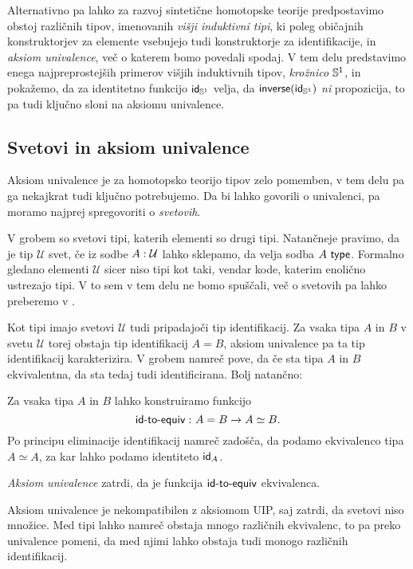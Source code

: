 Alternativno pa lahko za razvoj sintetične homotopske teorije predpostavimo obstoj različnih tipov, imenovanih \emph{višji induktivni tipi}, ki poleg običajnih konstruktorjev za elemente vsebujejo tudi konstruktorje za identifikacije, in \emph{aksiom univalence}, več o katerem bomo povedali spodaj. V tem delu predstavimo enega najpreprostejših primerov višjih induktivnih tipov, \emph{krožnico} \(\mathbb{S}^{1}\), in pokažemo, da za identitetno funkcijo \(\textnormal{\textsf{id}}_{\mathbb{S}^{1}}\) velja, da \(\textnormal{\textsf{inverse}}(\textnormal{\textsf{id}}_{\mathbb{S}^{1}})\) \emph{ni} propozicija, to pa tudi ključno sloni na aksiomu univalence.

\subsection{Svetovi in aksiom univalence}

Aksiom univalence je za homotopsko teorijo tipov zelo pomemben, v tem delu pa ga nekajkrat tudi ključno potrebujemo. Da bi lahko govorili o univalenci, pa moramo najprej spregovoriti o \emph{svetovih}.

V grobem so svetovi tipi, katerih elementi so drugi tipi. Natančneje pravimo, da je tip \(\mathcal{U}\) svet, če iz sodbe \(A : \mathcal{U}\) lahko sklepamo, da velja sodba \(A\ \textnormal{\textsf{type}}\). Formalno gledano elementi \(\mathcal{U}\) sicer niso tipi kot taki, vendar kode, katerim enolično ustrezajo tipi. V to sem v tem delu ne bomo spuščali, več o svetovih pa lahko preberemo v \cite[Poglavje I.6]{rijke2022introduction}.

Kot tipi imajo svetovi \(\mathcal{U}\) tudi pripadajoči tip identifikacij. Za vsaka tipa \(A\) in \(B\) v svetu \(\mathcal{U}\) torej obstaja tip identifikacij \(A = B\), aksiom univalence pa ta tip identifikacij karakterizira. V grobem namreč pove, da če sta tipa \(A\) in \(B\) ekvivalentna, da sta tedaj tudi identificirana. Bolj natančno:

\begin{definicija}
  Za vsaka tipa \(A\) in \(B\) lahko konstruiramo funkcijo
  \[\textnormal{\textsf{id-to-equiv}} \,\colon A = B \to A \simeq B.\]
  Po principu eliminacije identifikacij namreč zadošča, da podamo ekvivalenco tipa \(A \simeq A\), za kar lahko podamo identiteto \(\textnormal{\textsf{id}}_{A}\).

  \emph{Aksiom univalence} zatrdi, da je funkcija \(\textnormal{\textsf{id-to-equiv}}\) ekvivalenca.
\end{definicija}

Aksiom univalence je nekompatibilen z aksiomom UIP, saj zatrdi, da svetovi niso množice. Med tipi lahko namreč obstaja mnogo različnih ekvivalenc, to pa preko univalence pomeni, da med njimi lahko obstaja tudi monogo različnih identifikacij.

